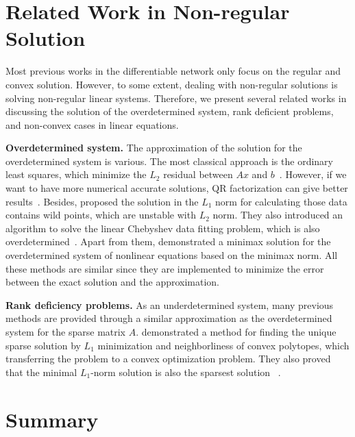 \section{Related Work in Non-regular Solution}
\label{sec:relatedworknonreg}
Most previous works in the differentiable network only focus on the regular and convex solution. However, to some extent, dealing with non-regular solutions is solving non-regular linear systems. Therefore, we present several related works in discussing the solution of the overdetermined system, rank deficient problems, and non-convex cases in linear equations. 
\par \textbf{Overdetermined system.} The approximation of the solution for the overdetermined system is various. The most classical approach is the ordinary least squares, which minimize the $L_2$ residual between $Ax$ and $b$~\citep{AH:13}. However, if we want to have more numerical accurate solutions, QR factorization can give better results~\citep{TL:97}. Besides, \cite{BI:74} proposed the solution in the $L_1$ norm for calculating those data contains wild points, which are unstable with $L_2$ norm. They also introduced an algorithm to solve the linear Chebyshev data fitting problem, which is also overdetermined~\citep{BI:75}. Apart from them, \cite{WG:79} demonstrated a minimax solution for the overdetermined system of nonlinear equations based on the minimax norm. All these methods are similar since they are implemented to minimize the error between the exact solution and the approximation. 
\par \textbf{Rank deficiency problems.} As an underdetermined system, many previous methods are provided through a similar approximation as the overdetermined system for the sparse matrix $A$. \cite{DD:05} demonstrated a method for finding the unique sparse solution by $L_1$ minimization and neighborliness of convex polytopes, which transferring the problem to a convex optimization problem. They also proved that the minimal $L_1$-norm solution is also the sparsest solution ~\citep{DD:06}. 



\section{Summary}
